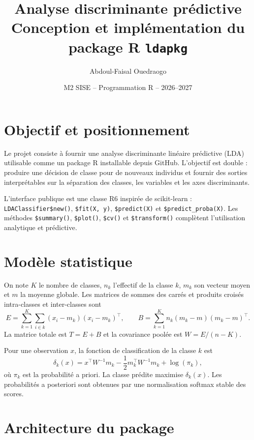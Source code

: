 \documentclass[11pt,a4paper]{article}
\title{Analyse discriminante prédictive\\
       \large Conception et implémentation du package R \texttt{ldapkg}}
\author{Abdoul-Faisal Ouedraogo}
\date{M2 SISE -- Programmation R -- 2026--2027}
\begin{document}
\maketitle
\tableofcontents
\newpage

\section{Objectif et positionnement}

Le projet consiste à fournir une analyse discriminante linéaire prédictive
(LDA) utilisable comme un package R installable depuis GitHub. L'objectif
est double : produire une décision de classe pour de nouveaux individus et
fournir des sorties interprétables sur la séparation des classes, les
variables et les axes discriminants.

L'interface publique est une classe R6 inspirée de scikit-learn :
\texttt{LDAClassifier\$new()}, \texttt{\$fit(X, y)}, \texttt{\$predict(X)}
et \texttt{\$predict\_proba(X)}. Les méthodes \texttt{\$summary()},
\texttt{\$plot()}, \texttt{\$cv()} et \texttt{\$transform()} complètent
l'utilisation analytique et prédictive.

\section{Modèle statistique}

On note $K$ le nombre de classes, $n_k$ l'effectif de la classe $k$,
$m_k$ son vecteur moyen et $m$ la moyenne globale. Les matrices de sommes
des carrés et produits croisés intra-classes et inter-classes sont
\[
 E = \sum_{k=1}^K\sum_{i\in k}(x_i-m_k)(x_i-m_k)^\top,\qquad
 B = \sum_{k=1}^K n_k(m_k-m)(m_k-m)^\top.
\]
La matrice totale est $T=E+B$ et la covariance poolée est
$W=E/(n-K)$.

Pour une observation $x$, la fonction de classification de la classe $k$ est
\[
 \delta_k(x)=x^\top W^{-1}m_k
 -\frac12m_k^\top W^{-1}m_k+\log(\pi_k),
\]
où $\pi_k$ est la probabilité a priori. La classe prédite maximise
\(\delta_k(x)\). Les probabilités a posteriori sont obtenues par une
normalisation softmax stable des scores.

\section{Architecture du package}
\end{document}
